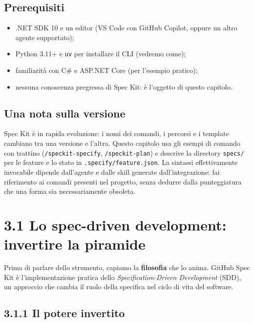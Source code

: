 \documentclass[
  italian,
  10pt,
]{book}
\providecommand{\tightlist}{%
  \setlength{\itemsep}{0pt}\setlength{\parskip}{0pt}}
\begin{document}
\subsection{Prerequisiti}\label{prerequisiti}

\begin{itemize}
\tightlist
\item
  .NET SDK 10 e un editor (VS Code con GitHub Copilot, oppure un altro
  agente supportato);
\item
  Python 3.11+ e \texttt{uv} per installare il CLI (vedremo come);
\item
  familiarità con C\# e ASP.NET Core (per l'esempio pratico);
\item
  nessuna conoscenza pregressa di Spec Kit: è l'oggetto di questo
  capitolo.
\end{itemize}

\subsection{Una nota sulla versione}\label{una-nota-sulla-versione}

Spec Kit è in rapida evoluzione: i nomi dei comandi, i percorsi e i
template cambiano tra una versione e l'altra. Questo capitolo usa gli
esempi di comando con trattino (\texttt{/speckit-specify},
\texttt{/speckit-plan}) e descrive la directory \texttt{specs/} per le
feature e lo stato in \texttt{.specify/feature.json}. La sintassi
effettivamente invocabile dipende dall'agente e dalle skill generate
dall'integrazione: fai riferimento ai comandi presenti nel progetto,
senza dedurre dalla punteggiatura che una forma sia necessariamente
obsoleta.

\section{3.1 Lo spec-driven development: invertire la
piramide}\label{lo-spec-driven-development-invertire-la-piramide}

Prima di parlare dello strumento, capiamo la \textbf{filosofia} che lo
anima. GitHub Spec Kit è l'implementazione pratica dello
\emph{Specification-Driven Development} (SDD), un approccio che cambia
il ruolo della specifica nel ciclo di vita del software.

\subsection{3.1.1 Il potere invertito}\label{il-potere-invertito}
\end{document}
